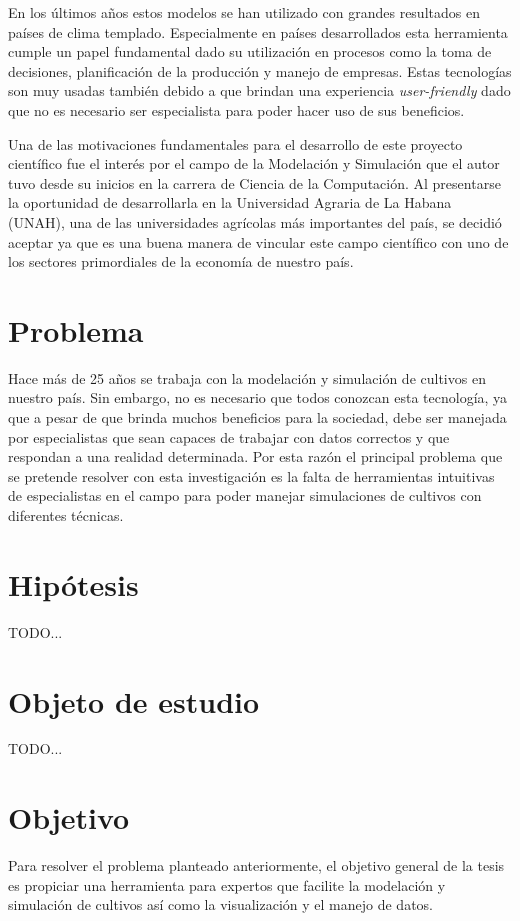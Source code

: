 En los últimos años estos modelos se han utilizado con grandes resultados en países de clima templado. Especialmente en países desarrollados esta herramienta cumple un papel fundamental dado su utilización en procesos como la toma de decisiones, planificación de la producción y manejo de empresas. Estas tecnologías son muy usadas también debido a que brindan una experiencia \textit{user-friendly} dado que no es necesario ser especialista para poder hacer uso de sus beneficios.

Una de las motivaciones fundamentales para el desarrollo de este proyecto científico fue el interés por el campo de la Modelación y Simulación que el autor tuvo desde su inicios en la carrera de Ciencia de la Computación. Al presentarse la oportunidad de desarrollarla en la Universidad Agraria de La Habana (UNAH), una de las universidades agrícolas más importantes del país, se decidió aceptar ya que es una buena manera de vincular este campo científico con uno de los sectores primordiales de la economía de nuestro país.


\section*{Problema}
Hace más de 25 años se trabaja con la modelación y simulación de cultivos en nuestro país. Sin embargo, no es necesario que todos conozcan esta tecnología, ya que a pesar de que brinda muchos beneficios para la sociedad, debe ser manejada por especialistas que sean capaces de trabajar con datos correctos y que respondan a una realidad determinada. 
Por esta razón el principal problema que se pretende resolver con esta investigación es la falta de herramientas intuitivas de especialistas en el campo para poder manejar simulaciones de cultivos con diferentes técnicas.

\section*{Hipótesis}
TODO...

\section*{Objeto de estudio}
TODO...

\section*{Objetivo}
Para resolver el problema planteado anteriormente, el objetivo general de la tesis es propiciar una herramienta para expertos que facilite la modelación y simulación de cultivos así como la visualización y el manejo de datos.

